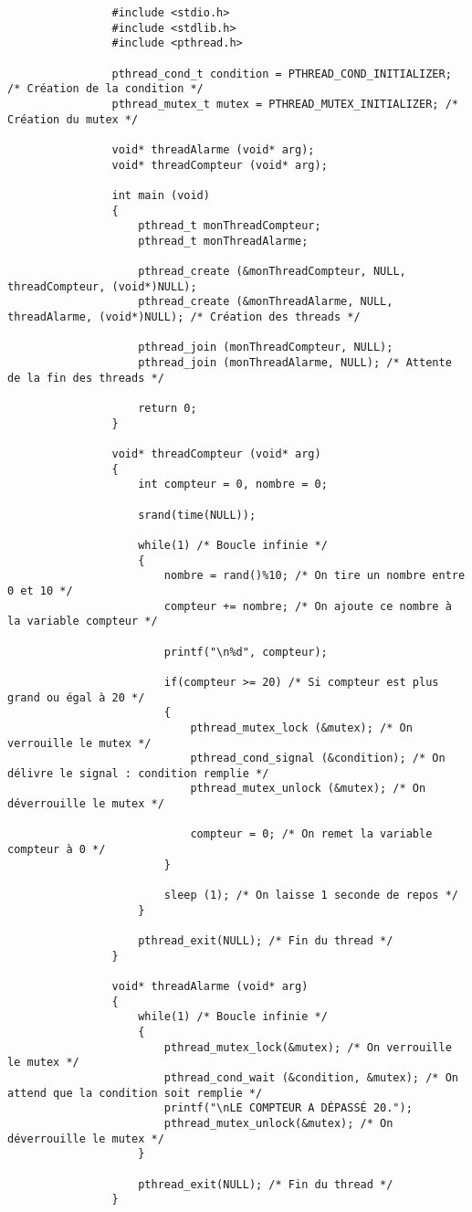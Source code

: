 			\begin{lstlisting}
				#include <stdio.h>
				#include <stdlib.h>
				#include <pthread.h>

				pthread_cond_t condition = PTHREAD_COND_INITIALIZER; /* Création de la condition */
				pthread_mutex_t mutex = PTHREAD_MUTEX_INITIALIZER; /* Création du mutex */

				void* threadAlarme (void* arg);
				void* threadCompteur (void* arg);

				int main (void)
				{
					pthread_t monThreadCompteur;
					pthread_t monThreadAlarme;

					pthread_create (&monThreadCompteur, NULL, threadCompteur, (void*)NULL);
					pthread_create (&monThreadAlarme, NULL, threadAlarme, (void*)NULL); /* Création des threads */

					pthread_join (monThreadCompteur, NULL);
					pthread_join (monThreadAlarme, NULL); /* Attente de la fin des threads */

					return 0;
				}

				void* threadCompteur (void* arg)
				{
					int compteur = 0, nombre = 0;
					
					srand(time(NULL));

					while(1) /* Boucle infinie */
					{
						nombre = rand()%10; /* On tire un nombre entre 0 et 10 */
						compteur += nombre; /* On ajoute ce nombre à la variable compteur */

						printf("\n%d", compteur);
						
						if(compteur >= 20) /* Si compteur est plus grand ou égal à 20 */
						{
							pthread_mutex_lock (&mutex); /* On verrouille le mutex */
							pthread_cond_signal (&condition); /* On délivre le signal : condition remplie */
							pthread_mutex_unlock (&mutex); /* On déverrouille le mutex */

							compteur = 0; /* On remet la variable compteur à 0 */
						}

						sleep (1); /* On laisse 1 seconde de repos */
					}
					
					pthread_exit(NULL); /* Fin du thread */
				}

				void* threadAlarme (void* arg)
				{
					while(1) /* Boucle infinie */
					{
						pthread_mutex_lock(&mutex); /* On verrouille le mutex */
						pthread_cond_wait (&condition, &mutex); /* On attend que la condition soit remplie */
						printf("\nLE COMPTEUR A DÉPASSÉ 20."); 
						pthread_mutex_unlock(&mutex); /* On déverrouille le mutex */
					}
					
					pthread_exit(NULL); /* Fin du thread */
				}

			\end{lstlisting}